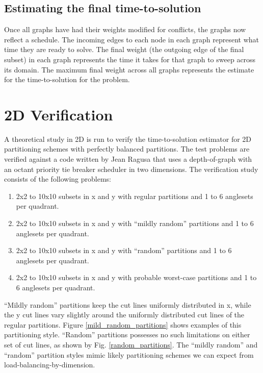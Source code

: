 \subsection{Estimating the final time-to-solution}

Once all graphs have had their weights modified for conflicts, the graphs now reflect a schedule. The incoming edges to each node in each graph represent what time they are ready to solve. The final weight (the outgoing edge of the final subset) in each graph represents the time it takes for that graph to sweep across its domain. The maximum final weight across all graphs represents the estimate for the time-to-solution for the problem.

\section{2D Verification}

A theoretical study in 2D is run to verify the time-to-solution estimator for 2D partitioning schemes with perfectly balanced partitions. The test problems are verified against a code written by Jean Ragusa that uses a depth-of-graph with an octant priority tie breaker scheduler in two dimensions. The verification study consists of the following problems:
\begin{enumerate}
	\item 2x2 to 10x10 subsets in x and y with regular partitions and 1 to 6 anglesets per quadrant.
	\item 2x2 to 10x10 subsets in x and y with ``mildly random'' partitions and 1 to 6 anglesets per quadrant.
	\item  2x2 to 10x10 subsets in x and y with ``random'' partitions and 1 to 6 anglesets per quadrant.
	\item  2x2 to 10x10 subsets in x and y with probable worst-case partitions and 1 to 6 anglesets per quadrant.
\end{enumerate}

``Mildly random'' partitions keep the cut lines uniformly distributed in x, while the y cut lines vary slightly around the uniformly distributed cut lines of the regular partitions. Figure \ref{mild_random_partitions} shows examples of this partitioning style. ``Random'' partitions possesses no such limitations on either set of cut lines, as shown by Fig. \ref{random_partitions}. The ``mildly random'' and ``random'' partition styles mimic likely partitioning schemes we can expect from load-balancing-by-dimension.

